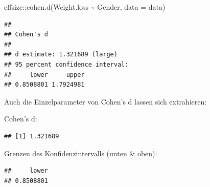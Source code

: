 \documentclass[
]{book}
\newenvironment{Shaded}{\begin{snugshade}}{\end{snugshade}}
\newcommand{\AttributeTok}[1]{\textcolor[rgb]{0.77,0.63,0.00}{#1}}
\newcommand{\DecValTok}[1]{\textcolor[rgb]{0.00,0.00,0.81}{#1}}
\newcommand{\FunctionTok}[1]{\textcolor[rgb]{0.00,0.00,0.00}{#1}}
\newcommand{\NormalTok}[1]{#1}
\newcommand{\SpecialCharTok}[1]{\textcolor[rgb]{0.00,0.00,0.00}{#1}}
\begin{document}
\begin{Shaded}
\begin{Highlighting}[]
\NormalTok{effsize}\SpecialCharTok{::}\FunctionTok{cohen.d}\NormalTok{(Weight.loss }\SpecialCharTok{\textasciitilde{}}\NormalTok{ Gender, }\AttributeTok{data =}\NormalTok{ data)}
\end{Highlighting}
\end{Shaded}

\begin{verbatim}
## 
## Cohen's d
## 
## d estimate: 1.321689 (large)
## 95 percent confidence interval:
##     lower     upper 
## 0.8508801 1.7924981
\end{verbatim}

Auch die Einzelparameter von Cohen's d lassen sich extrahieren:

Cohen's d:

\begin{Shaded}
\end{Shaded}

\begin{verbatim}
## [1] 1.321689
\end{verbatim}

Grenzen des Konfidenzintervalls (unten \& oben):

\begin{Shaded}
\end{Shaded}

\begin{verbatim}
##     lower 
## 0.8508801
\end{verbatim}

\begin{Shaded}
\end{Shaded}
\end{document}
